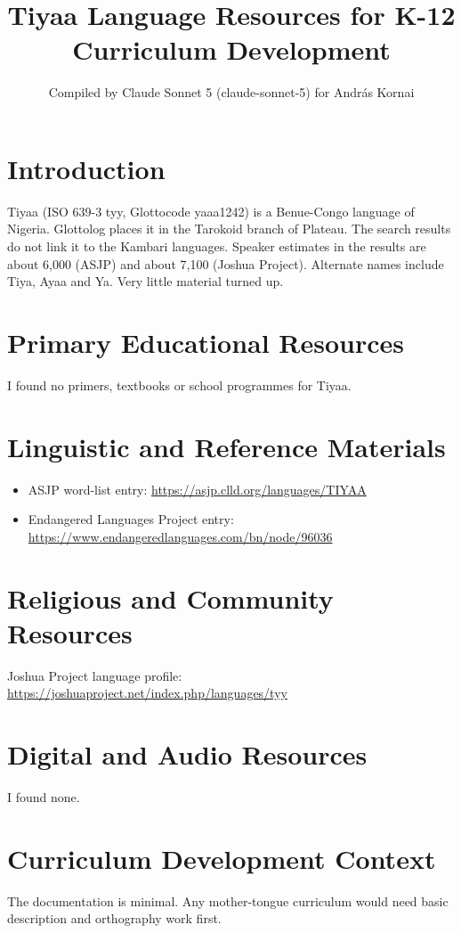 \documentclass[12pt]{article}
\title{Tiyaa Language Resources for K-12 Curriculum Development}
\author{Compiled by Claude Sonnet 5 (claude-sonnet-5) for Andr\'as Kornai}
\date{}
\begin{document}
\maketitle

\section{Introduction}
Tiyaa (ISO 639-3 tyy, Glottocode yaaa1242) is a Benue-Congo language of Nigeria. Glottolog places it in the Tarokoid branch of Plateau. The search results do not link it to the Kambari languages. Speaker estimates in the results are about 6,000 (ASJP) and about 7,100 (Joshua Project). Alternate names include Tiya, Ayaa and Ya. Very little material turned up.

\section{Primary Educational Resources}
I found no primers, textbooks or school programmes for Tiyaa.

\section{Linguistic and Reference Materials}
\begin{itemize}
\item ASJP word-list entry: \url{https://asjp.clld.org/languages/TIYAA}
\item Endangered Languages Project entry: \url{https://www.endangeredlanguages.com/bn/node/96036}
\end{itemize}

\section{Religious and Community Resources}
Joshua Project language profile: \url{https://joshuaproject.net/index.php/languages/tyy}

\section{Digital and Audio Resources}
I found none.

\section{Curriculum Development Context}
The documentation is minimal. Any mother-tongue curriculum would need basic description and orthography work first.
\end{document}
